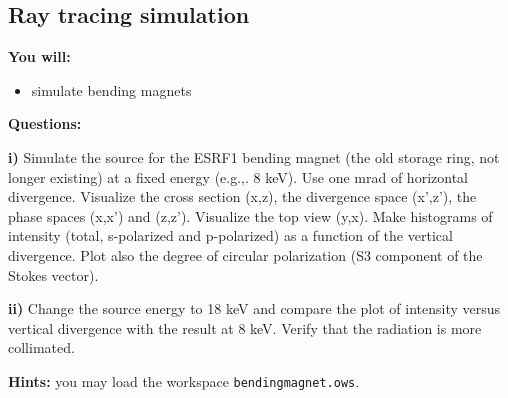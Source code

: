 \subsection{Ray tracing simulation}

\begin{youwillbox}
\textbf{You will:}

\begin{itemize}
    \item simulate bending magnets
\end{itemize}
\end{youwillbox}

\begin{questionsbox}
\textbf{Questions:}

\textbf{i)} Simulate the source for the ESRF1 bending magnet (the old storage ring, not longer existing) at a fixed energy (e.g.,. 8 keV). Use one mrad of horizontal divergence. Visualize the cross section (x,z), the divergence space (x',z'), the phase spaces (x,x') and (z,z'). Visualize the top view (y,x). Make histograms of intensity (total, s-polarized and p-polarized) as a function of the vertical divergence. Plot also the degree of circular polarization (S3 component of the Stokes vector).

\textbf{ii)} Change the source energy to 18 keV and compare the plot of intensity versus vertical divergence with the result at 8 keV. Verify that the radiation is more collimated.
\end{questionsbox}

\begin{hintsbox}
\textbf{Hints:} you may load the workspace {\tt bendingmagnet.ows}.
\end{hintsbox}

